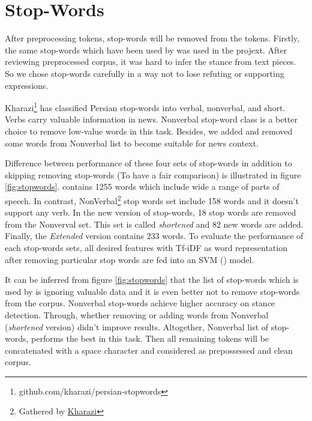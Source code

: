 \section{Stop-Words}
After preprocessing tokens, stop-words will be removed from the tokens. Firstly, the same stop-words which have been used by \cite{stance_persian} was used in the projext. After reviewing preprocessed corpus, it was hard to infer the stance from text pieces. So we chose stop-words carefully in a way not to lose refuting or supporting expressions.

Kharazi\footnote{\label{fn:kharazi}github.com/kharazi/persian-stopwords} has classified Persian stop-words into verbal, nonverbal, and short. Verbs carry valuable information in news. Nonverbal stop-word class is a better choice to remove low-value words in this task. Besides, we added and removed some words from Nonverbal list to become suitable for news context. 


Difference between performance of these four sets of stop-words in addition to skipping removing stop-words (To have a fair comparison) is illustrated in figure \ref{fig:stopwords}. \cite{stance_persian} contains 1255 words which include wide a range of parts of speech. In contrast, NonVerbal\footnote{Gathered by \href{github.com/kharazi/persian-stopwords}{Kharazi}} stop words set include 158 words and it doesn't support any verb. In the new version of stop-words, 18 stop words are removed from the Nonverval set. This set is called \textit{shortened} and 82 new words are added. Finally, the \textit{Extended} version contains 233 words. To evaluate the performance of each stop-words sets, all desired features with Tf-iDF as word representation after removing particular stop words are fed into an SVM (\cite{svc}) model.

It can be inferred from figure \ref{fig:stopwords} that the list of stop-words which is used by \cite{stance_persian} is ignoring valuable data and it is even better not to remove stop-words from the corpus. Nonverbal stop-words achieve higher accuracy on stance detection. Through, whether removing or adding words from Nonverbal (\textit{shortened} version) didn't improve results. Altogether, Nonverbal list of stop-words, performs the best in this task. 
Then all remaining tokens will be concatenated with a space character and considered as prepossessed and clean corpus.


